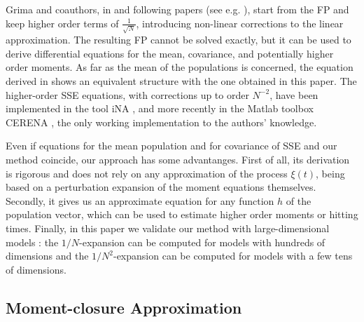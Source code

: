 \documentclass[sigconf]{acmart}
\begin{document}
Grima and coauthors, in \cite{grima2010effective} and following papers (see e.g. \cite{grima2011,ina2012,ina2013}), start from the FP and keep higher order terms of  $\frac{1}{\sqrt{N}}$, introducing non-linear corrections to the linear approximation. The resulting FP cannot be solved exactly, but it can be used to derive differential equations for the mean, covariance, and potentially higher order moments. As far as the mean of the populations is concerned, the equation derived in \cite{grima2010effective,grima2011} shows an equivalent structure with the one obtained in this paper. The higher-order SSE equations, with corrections up to order $N^{-2}$, have been implemented in the tool iNA \cite{ina2012,ina2013}, and more recently in the Matlab toolbox CERENA \cite{CERENA2016}, the only working implementation to the authors' knowledge.

Even if equations for the mean population and for covariance of SSE
and our method coincide, our approach has some advantanges. First of
all, its derivation is rigorous and does not rely on any approximation
of the process $\xi(t)$, being based on a perturbation expansion of
the moment equations themselves. Secondly, it gives us an approximate
equation for any function $h$ of the population vector, which can be
used to estimate higher order moments or hitting times. 
Finally, in this paper we validate our method with large-dimensional
models : the $1/N$-expansion can be computed for models with hundreds
of dimensions and the $1/N^2$-expansion can be computed for models
with a few tens of dimensions.





\subsection{Moment-closure Approximation} 
\end{document}
